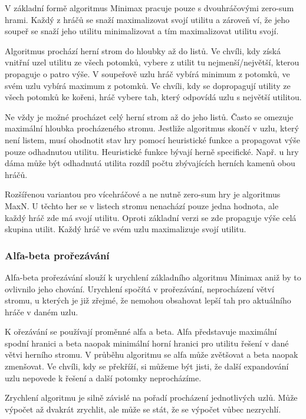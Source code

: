 V základní formě algoritmus Minimax pracuje pouze s dvouhráčovými zero-sum hrami. Každý z hráčů se snaží maximalizovat svojí utilitu a zároveň ví, že jeho soupeř se snaží jeho utilitu minimalizovat a tím maximalizovat utilitu svojí. 

Algoritmus prochází herní strom do hloubky až do listů. Ve chvíli, kdy získá vnitřní uzel utilitu ze všech potomků, vybere z utilit tu nejmenší/největší, kterou propaguje o patro výše. V soupeřově uzlu hráč vybírá minimum z potomků, ve svém uzlu vybírá maximum z potomků. Ve chvíli, kdy se dopropagují utility ze všech potomků ke kořeni, hráč vybere tah, který odpovídá uzlu s největší utilitou.

Ne vždy je možné procházet celý herní strom až do jeho listů. Často se omezuje maximální hloubka procházeného stromu. Jestliže algoritmus skončí v uzlu, který není listem, musí ohodnotit stav hry pomocí heuristické funkce a propagovat výše pouze odhadnutou utilitu. Heuristické funkce bývají herně specifické. Např. u hry dáma může být odhadnutá utilita rozdíl počtu zbývajících herních kamenů obou hráčů.

Rozšířenou variantou pro vícehráčové a ne nutně zero-sum hry je algoritmus MaxN. U těchto her se v listech stromu nenachází pouze jedna hodnota, ale každý hráč zde má svojí utilitu. Oproti základní verzi se zde propaguje výše celá skupina utilit. Každý hráč ve svém uzlu maximalizuje svojí utilitu.

\subsubsection{Alfa-beta prořezávání}

Alfa-beta prořezávání slouží k urychlení základního algoritmu Minimax aniž by to ovlivnilo jeho chování. Urychlení spočítá v prořezávání, neprocházení větví stromu, u kterých je již zřejmé, že nemohou obsahovat lepší tah pro aktuálního hráče v daném uzlu.

K ořezávání se používají proměnné alfa a beta. Alfa představuje maximální spodní hranici a beta naopak minimální horní hranici pro utilitu řešení v dané větvi herního stromu. V průběhu algoritmu se alfa může zvětšovat a beta naopak zmenšovat. Ve chvíli, kdy se překříží, si můžeme být jisti, že další expandování uzlu nepovede k řešení a další potomky neprocházíme.

Zrychlení algoritmu je silně závislé na pořadí procházení jednotlivých uzlů. Může výpočet až dvakrát zrychlit, ale může se stát, že se výpočet vůbec nezrychlí.

